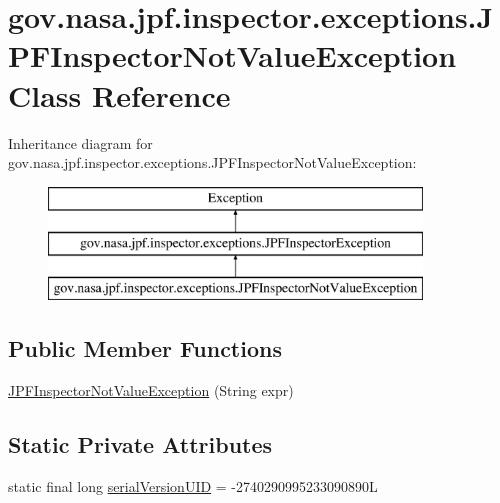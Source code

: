 \hypertarget{classgov_1_1nasa_1_1jpf_1_1inspector_1_1exceptions_1_1_j_p_f_inspector_not_value_exception}{}\section{gov.\+nasa.\+jpf.\+inspector.\+exceptions.\+J\+P\+F\+Inspector\+Not\+Value\+Exception Class Reference}
\label{classgov_1_1nasa_1_1jpf_1_1inspector_1_1exceptions_1_1_j_p_f_inspector_not_value_exception}
Inheritance diagram for gov.\+nasa.\+jpf.\+inspector.\+exceptions.\+J\+P\+F\+Inspector\+Not\+Value\+Exception\+:\begin{figure}[H]
\begin{center}
\leavevmode
\includegraphics[height=3.000000cm]{classgov_1_1nasa_1_1jpf_1_1inspector_1_1exceptions_1_1_j_p_f_inspector_not_value_exception}
\end{center}
\end{figure}
\subsection*{Public Member Functions}
\begin{DoxyCompactItemize}
\item 
\hyperlink{classgov_1_1nasa_1_1jpf_1_1inspector_1_1exceptions_1_1_j_p_f_inspector_not_value_exception_aaf8096c0d943a6eacb94a40e30d54626}{J\+P\+F\+Inspector\+Not\+Value\+Exception} (String expr)
\end{DoxyCompactItemize}
\subsection*{Static Private Attributes}
\begin{DoxyCompactItemize}
\item 
static final long \hyperlink{classgov_1_1nasa_1_1jpf_1_1inspector_1_1exceptions_1_1_j_p_f_inspector_not_value_exception_a788c71d416499efebb0ce116d9a59f03}{serial\+Version\+U\+ID} = -\/2740290995233090890L
\end{DoxyCompactItemize}


